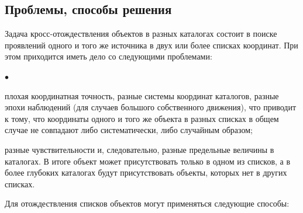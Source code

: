\documentclass[12pt, a4paper]{article}
\newenvironment{compactlist}{
    \begin{list}{{$\bullet$}}{
      \setlength\partopsep{0pt}
      \setlength\parskip{0pt}
      \setlength\parsep{0pt}
      \setlength\topsep{0pt}
      \setlength\itemsep{0pt}
} }{
\end{list} }
\begin{document}
	\subsection*{Проблемы, способы решения}
	Задача кросс-отождествления объектов в разных каталогах состоит в поиске проявлений одного и того же источника в двух или более списках координат. При этом приходится иметь дело со следующими проблемами:
	\begin{compactlist}
		\item плохая координатная точность, разные системы координат каталогов, разные эпохи наблюдений (для случаев большого собственного движения), что приводит к тому, что координаты одного и того же объекта в разных списках в общем случае не совпадают либо систематически, либо случайным образом;
		\item разные чувствительности и, следовательно, разные предельные величины в каталогах. В итоге объект может присутствовать только в одном из списков, а в более глубоких каталогах будут присутствовать объекты, которых нет в других списках.
	\end{compactlist}
	Для отождествления списков объектов могут применяться следующие способы:
\end{document}
